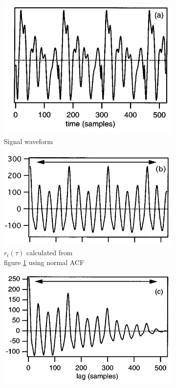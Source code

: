 \begin{enumerate}
	\begin{figure}
		\centering
		\begin{subfigure}{.3\textwidth}
		  \centering
		  \includegraphics[width=1\linewidth]{Figures/signalwaveform.png}
		  \caption{Signal waveform}
		  \label{signal}
		\end{subfigure}%
		\begin{subfigure}{.3\textwidth}
			\centering
			\includegraphics[width=1\linewidth]{Figures/acf.png}
			\caption{$r_t(\tau)$ calculated from \\figure \ref{signal} using normal ACF}
			\label{acf}
		  \end{subfigure}%
		\begin{subfigure}{.3\textwidth}
		  \centering
		  \includegraphics[width=1\linewidth]{Figures/taperedacf.png}

\end{subfigure}
\end{figure}
\end{enumerate}
